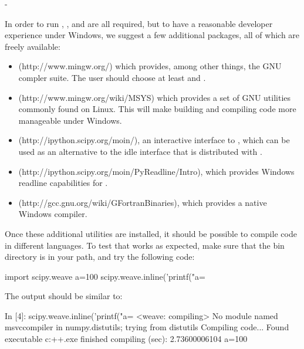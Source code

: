 -\documentclass[article]{jss}
\begin{document}
In order to run , ,  and
 are all required, but to have a reasonable developer
experience under Windows, we suggest a few additional packages, all of
which are freely available:
\begin{itemize}
\item {} (http://www.mingw.org/) which provides, among other
  things, the GNU compler suite. The user should choose at least
   and .
\item {} (http://www.mingw.org/wiki/MSYS) which provides a set
  of GNU utilities commonly found on Linux. This will make building
  and compiling code more manageable under Windows.
\item {} (http://ipython.scipy.org/moin/), an interactive
  interface to , which can be used as an alternative
  to the idle interface that is distributed with .
\item {}
  (http://ipython.scipy.org/moin/PyReadline/Intro), which provides
  Windows readline capabilities for .
\item {} (http://gcc.gnu.org/wiki/GFortranBinaries), which
  provides a native Windows  compiler.
\end{itemize}
Once these additional utilities are installed, it should be possible
to compile code in different languages. To test that  works
as expected, make sure that the  bin directory is in your
path, and try the following code:


\begin{Code}
import scipy.weave 
a=100 
scipy.weave.inline('printf("a=%
\end{Code}


The output should be similar to:


\begin{Code}
In [4]: scipy.weave.inline('printf("a=%
<weave: compiling>
No module named msvccompiler in numpy.distutils; trying from distutils
Compiling code...
Found executable c:\mingw\bin\g++.exe
finished compiling (sec):  2.73600006104
a=100
\end{Code}
\end{document}
